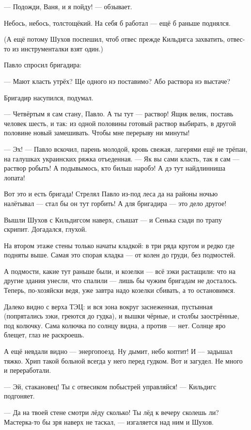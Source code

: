 --- Подожди, Ваня, и я пойду! --- обзывает.

Небось, небось, толстощёкий. На себя б работал --- ещё б раньше поднялся.

(А ещё потому Шухов поспешил, чтоб отвес прежде Кильдигса захватить, отвес-то из инструменталки взят один.)

Павло спросил бригадира:

--- Мают класть утрёх? Ще одного нэ поставимо? Або раствора нэ выстаче?

Бригадир насупился, подумал.

--- Четвёртым я сам стану, Павло. А ты тут --- раствор! Ящик велик, поставь человек шесть, и так: из одной половины готовый раствор выбирать, в другой половине новый замешивать. Чтобы мне перерыву ни минуты!

--- Эх! --- Павло вскочил, парень молодой, кровь свежая, лагерями ещё не трёпан, на галушках украинских ряжка отъеденная. --- Як вы сами класть, так я сам --- раствор робыть! А подывымось, кто бильш наробэ! А дэ тут найдлинниша лопата!

Вот это и есть бригада! Стрелял Павло из-под леса да на районы ночью налётывал --- стал бы он тут горбить! А для бригадира --- это дело другое!

Вышли Шухов с Кильдигсом наверх, слышат --- и Сенька сзади по трапу скрипит. Догадался, глухой.

На втором этаже стены только начаты кладкой: в три ряда кругом и редко где подняты выше. Самая это спорая кладка --- от колен до груди, без подмостей.

А подмости, какие тут раньше были, и козелки --- всё зэки растащили: что на другие здания унесли, что спалили --- лишь бы чужим бригадам не досталось. Теперь, по-хозяйски ведя, уже завтра надо козелки сбивать, а то остановимся.

Далеко видно с верха ТЭЦ: и вся зона вокруг заснеженная, пустынная (попрятались зэки, греются до гудка), и вышки чёрные, и столбы заострённые, под колючку. Сама колючка по солнцу видна, а против --- нет. Солнце яро блещет, глаз не раскроешь.

А ещё невдали видно --- энергопоезд. Ну дымит, небо коптит! И --- задышал тяжко. Хрип такой больной всегда у него перед гудком. Вот и загудел. Не много и переработали.

--- Эй, стакановец! Ты с отвесиком побыстрей управляйся! --- Кильдигс подгоняет.

--- Да на твоей стене смотри лёду сколько! Ты лёд к вечеру сколешь ли? Мастерка-то бы зря наверх не таскал, --- изгаляется над ним и Шухов.

